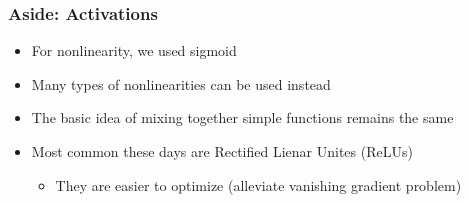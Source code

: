 \documentclass[10pt,mathserif]{beamer}
\begin{document}
\begin{frame}
  \frametitle{Aside: Activations}
  \begin{itemize}
  \item For nonlinearity, we used sigmoid
  \item Many types of nonlinearities can be used instead
  \item The basic idea of mixing together simple functions remains the same
  \item Most common these days are Rectified Lienar Unites (ReLUs)
    \begin{itemize}
    \item They are easier to optimize (alleviate vanishing gradient problem)
    \end{itemize}
  \end{itemize}
\begin{figure}[ht]
  \centering
    \begin{subfigure}{0.16\paperwidth}
      \centering

\end{subfigure}
\end{figure}
\end{frame}
\end{document}
